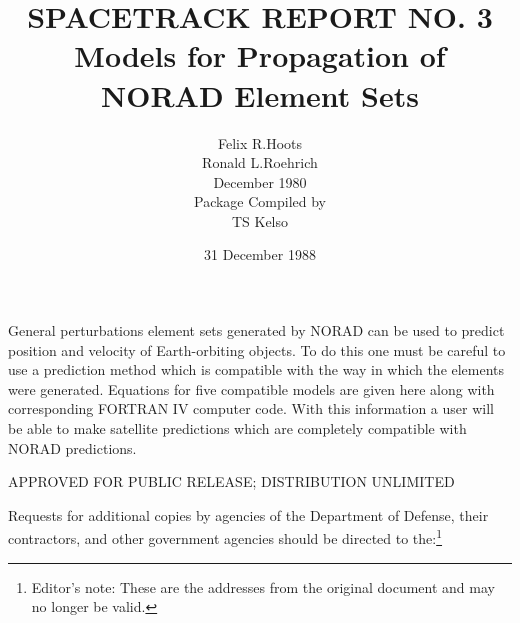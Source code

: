 \oddsidemargin 0in
\evensidemargin 0in
\textwidth 6.5in
\textheight 9in
\topmargin -36pt
\headheight 12pt
\headsep 24pt
\parindent 0pt
\def\dfrac#1#2{{\displaystyle{#1\over#2}}}
\def\dt{(t-t_o)}
\def\Epo{(E+\omega)}
\def\dddot#1{#1}
\def\dn{\dot{n}}
\def\dr{\dot{r}}
\def\dv{\dot{v}}
\def\df{\dot{f}}
\def\dM{\dot{M}}
\def\dC{\dot{C}}
\def\dD{\dot{D}}
\def\dom{\dot{\omega}}
\def\dOm{\dot{\Omega}}
\def\dal{\dot{\alpha}}
\def\dxi{\dot{\xi}}
\def\de{\dot{e}}
\def\deta{\dot{\eta}}
\def\dpsi{\dot{\psi}}
\def\ddn{\ddot{n}}
\def\dde{\ddot{e}}
\def\ddxi{\ddot{\xi}}
\def\ddeta{\ddot{\eta}}
\def\ddD{\ddot{D}}
\def\dddn{\stackrel{{\ldotp\ldotp\ldotp}}{n}}
\def\ppa{a''}
\def\ppn{n''}
\def\ppao{a''_o}
\def\ppno{n''_o}
\def\Mvec{{\bf M}}
\def\Nvec{{\bf N}}
\def\Uvec{{\bf U}}
\def\Vvec{{\bf V}}
\def\rvec{{\bf r}}
\def\drvec{\dot{\rvec}}
\def\L{{I\hspace{-3pt}L}}
\title{SPACETRACK REPORT NO. 3\\[12pt]
Models for Propagation of\\
NORAD Element Sets}
\author{ {\sc Felix R.\@ Hoots}\\
{\sc Ronald L.\@ Roehrich}\\[12pt]
{\sc December 1980}\\[12pt]
Package Compiled by\\
TS Kelso}
\date{31 December 1988}

\maketitle

General perturbations element sets generated by NORAD can be used to predict
position and velocity of Earth-orbiting objects.  To do this one must be
careful to use a prediction method which is compatible with the way in which
the elements were generated.  Equations for five compatible models are given
here along with corresponding FORTRAN IV computer code.  With this information
a user will be able to make satellite predictions which are completely
compatible with NORAD predictions.

\newpage
{}
\tableofcontents
\newpage
APPROVED FOR PUBLIC RELEASE; DISTRIBUTION UNLIMITED

\vspace{1in}
Requests for additional copies by agencies of the Department of Defense, their
contractors, and other government agencies should be directed to
the:\footnote[1]{Editor's note: These are the addresses from the original document
and may no longer be valid.}

